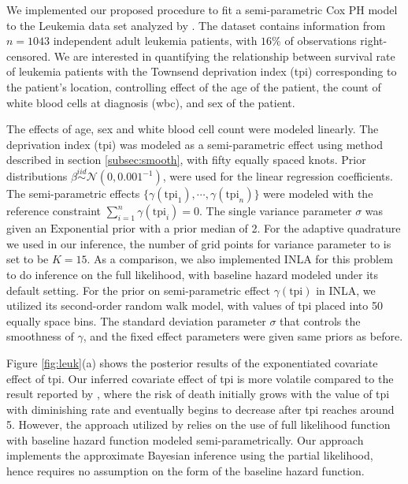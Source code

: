 \documentclass[ba]{imsart}
\begin{document}
We implemented our proposed procedure to fit a semi-parametric Cox PH model to the Leukemia data set analyzed by \cite{inlacoxph}. The dataset contains information from $n=1043$ independent adult leukemia patients, with $16\%$ of observations right-censored. We are interested in quantifying the relationship between survival rate of leukemia patients with the Townsend deprivation index (tpi) corresponding to the patient's location, controlling effect of the age of the patient, the count of white blood cells at diagnosis (wbc), and sex of the patient.

The effects of age, sex and white blood cell count were modeled linearly. The deprivation index (tpi) was modeled as a semi-parametric effect using method described in section \ref{subsec:smooth}, with fifty equally spaced knots. Prior distributions $\beta \stackrel{iid}{\sim} \mathcal{N}(0, 0.001^{-1})$, were used for the linear regression coefficients. The semi-parametric effects $\{\gamma(\text{tpi}_1), \cdots, \gamma(\text{tpi}_n)\}$ were modeled with the reference constraint $\sum_{i=1}^{n}\gamma(\text{tpi}_i) = 0$. The single variance parameter $\sigma$ was given an $\text{Exponential}$ prior with a prior median of 2. For the adaptive quadrature we used in our inference, the number of grid points for variance parameter to is set to be $K = 15$. As a comparison, we also implemented INLA for this problem to do inference on the full likelihood, with baseline hazard modeled under its default setting. For the prior on semi-parametric effect $\gamma(\text{tpi})$ in INLA, we utilized its second-order random walk model, with values of tpi placed into 50 equally space bins. The standard deviation parameter $\sigma$ that controls the smoothness of $\gamma$, and the fixed effect parameters were given same priors as before.

Figure \ref{fig:leuk}(a) shows the posterior results of the exponentiated covariate effect of tpi. Our inferred covariate effect of tpi is more volatile compared to the result reported by \cite{inlacoxph}, where the risk of death initially grows with the value of tpi with diminishing rate and eventually begins to decrease after tpi reaches around 5. However, the approach utilized by \cite{inlacoxph} relies on the use of full likelihood function with baseline hazard function modeled semi-parametrically. Our approach implements the approximate Bayesian inference using the partial likelihood, hence requires no assumption on the form of the baseline hazard function. 
\end{document}
